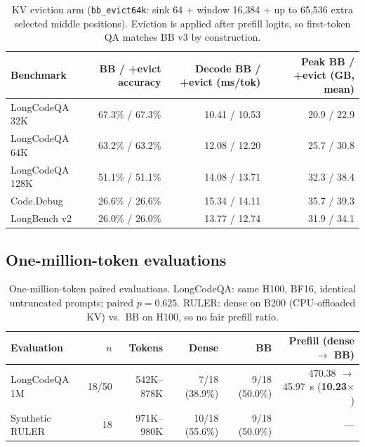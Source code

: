 \documentclass[11pt]{article}
\begin{document}
\begin{table}[ht]
  \centering
  \small
  \caption{KV eviction arm (\texttt{bb\_evict64k}: sink 64 + window 16{,}384 +
  up to 65{,}536 extra selected middle positions). Eviction is applied after
  prefill logits, so first-token QA matches BB v3 by construction.}
  \label{tab:r1-evict}
  \begin{tabular}{@{}lrrr@{}}
    \toprule
    Benchmark & BB / +evict accuracy & Decode BB / +evict (ms/tok) & Peak BB / +evict (GB, mean) \\
    \midrule
    LongCodeQA 32K  & 67.3\% / 67.3\% & 10.41 / 10.53 & 20.9 / 22.9 \\
    LongCodeQA 64K  & 63.2\% / 63.2\% & 12.08 / 12.20 & 25.7 / 30.8 \\
    LongCodeQA 128K & 51.1\% / 51.1\% & 14.08 / 13.71 & 32.3 / 38.4 \\
    Code.Debug      & 26.6\% / 26.6\% & 15.34 / 14.11 & 35.7 / 39.3 \\
    LongBench v2    & 26.0\% / 26.0\% & 13.77 / 12.74 & 31.9 / 34.1 \\
    \bottomrule
  \end{tabular}
\end{table}

\subsection{One-million-token evaluations}

\begin{table}[ht]
  \centering
  \small
  \caption{One-million-token paired evaluations. LongCodeQA: same H100, BF16,
  identical untruncated prompts; paired $p=0.625$. RULER: dense on B200
  (CPU-offloaded KV) vs.\ BB on H100, so no fair prefill ratio.}
  \label{tab:1m-evals}
  \begin{tabular}{@{}lrrrrr@{}}
    \toprule
    Evaluation & $n$ & Tokens & Dense & BB & Prefill (dense $\rightarrow$ BB) \\
    \midrule
    LongCodeQA 1M & 18/50 & 542K--878K & 7/18 (38.9\%) & 9/18 (50.0\%)
      & 470.38 $\rightarrow$ 45.97~s (\textbf{10.23$\times$}) \\
    Synthetic RULER & 18 & 971K--980K & 10/18 (55.6\%) & 9/18 (50.0\%)
      & --- \\
    \bottomrule
  \end{tabular}
\end{table}
\end{document}
